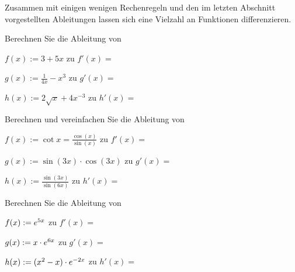 
\begin{MIntro}
Zusammen mit einigen wenigen Rechenregeln und den im letzten Abschnitt 
vorgestellten Ableitungen lassen sich eine Vielzahl an Funktionen 
differenzieren.
\end{MIntro}




\begin{MExercises}

\begin{MExercise}
Berechnen Sie die Ableitung von
\begin{MExerciseItems}
\item $f(x) := 3 + 5 x$
zu $f'(x) = $
%
\item $g(x) := \frac{1}{4 x} - x^3$
zu $g'(x) = $
%
\item $h(x) := 2 \sqrt{x} + 4 x^{-3}$
zu $h'(x) = $
\end{MExerciseItems}
\end{MExercise}

\begin{MExercise}
Berechnen und vereinfachen Sie die Ableitung von
\begin{MExerciseItems}
\item $f(x) := \cot x = \frac{\cos(x)}{\sin(x)}$
zu $f'(x) = $
%
\item $g(x) := \sin(3 x) \cdot \cos(3 x)$
zu $g'(x) = $
%
\item $h(x) := \frac{\sin(3 x)}{\sin(6 x)}$
zu $h'(x) = $
\end{MExerciseItems}
\end{MExercise}

\begin{MExercise}
Berechnen Sie die Ableitung von
\begin{MExerciseItems}
\item $f(x) := e^{5 x}$
zu $f'(x) = $
%
\item $g(x) := x \cdot e^{6 x}$
zu $g'(x) = $
%
\item $h(x) := (x^2 - x) \cdot e^{-2 x}$
zu $h'(x) = $
\end{MExerciseItems}
\end{MExercise}


\end{MExercises}
